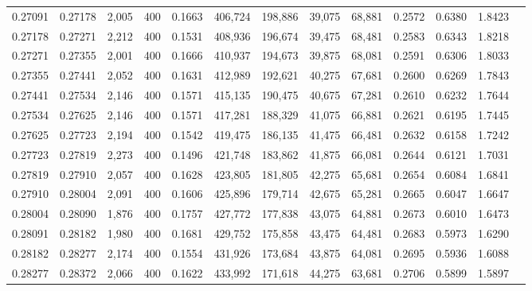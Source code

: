 \begin{tabular}{rrrrrrrrrrrrr}
0.27091 & 0.27178 &  2,005 & 400 &                                     0.1663 & 406,724 & 198,886 &  39,075 &  68,881 & 0.2572 & 0.6380 & 1.8423 \\
0.27178 & 0.27271 &  2,212 & 400 &                                     0.1531 & 408,936 & 196,674 &  39,475 &  68,481 & 0.2583 & 0.6343 & 1.8218 \\
0.27271 & 0.27355 &  2,001 & 400 &                                     0.1666 & 410,937 & 194,673 &  39,875 &  68,081 & 0.2591 & 0.6306 & 1.8033 \\
0.27355 & 0.27441 &  2,052 & 400 &                                     0.1631 & 412,989 & 192,621 &  40,275 &  67,681 & 0.2600 & 0.6269 & 1.7843 \\
0.27441 & 0.27534 &  2,146 & 400 &                                     0.1571 & 415,135 & 190,475 &  40,675 &  67,281 & 0.2610 & 0.6232 & 1.7644 \\
0.27534 & 0.27625 &  2,146 & 400 &                                     0.1571 & 417,281 & 188,329 &  41,075 &  66,881 & 0.2621 & 0.6195 & 1.7445 \\
0.27625 & 0.27723 &  2,194 & 400 &                                     0.1542 & 419,475 & 186,135 &  41,475 &  66,481 & 0.2632 & 0.6158 & 1.7242 \\
0.27723 & 0.27819 &  2,273 & 400 &                                     0.1496 & 421,748 & 183,862 &  41,875 &  66,081 & 0.2644 & 0.6121 & 1.7031 \\
0.27819 & 0.27910 &  2,057 & 400 &                                     0.1628 & 423,805 & 181,805 &  42,275 &  65,681 & 0.2654 & 0.6084 & 1.6841 \\
0.27910 & 0.28004 &  2,091 & 400 &                                     0.1606 & 425,896 & 179,714 &  42,675 &  65,281 & 0.2665 & 0.6047 & 1.6647 \\
0.28004 & 0.28090 &  1,876 & 400 &                                     0.1757 & 427,772 & 177,838 &  43,075 &  64,881 & 0.2673 & 0.6010 & 1.6473 \\
0.28091 & 0.28182 &  1,980 & 400 &                                     0.1681 & 429,752 & 175,858 &  43,475 &  64,481 & 0.2683 & 0.5973 & 1.6290 \\
0.28182 & 0.28277 &  2,174 & 400 &                                     0.1554 & 431,926 & 173,684 &  43,875 &  64,081 & 0.2695 & 0.5936 & 1.6088 \\
0.28277 & 0.28372 &  2,066 & 400 &                                     0.1622 & 433,992 & 171,618 &  44,275 &  63,681 & 0.2706 & 0.5899 & 1.5897 \\

\end{tabular}
